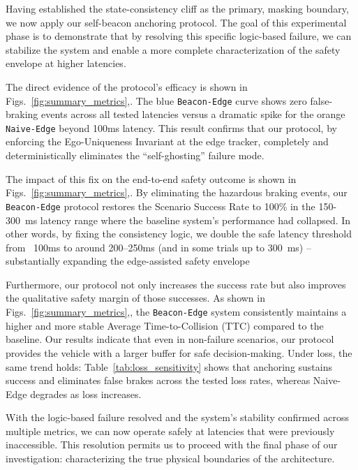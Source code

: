 Having established the state-consistency cliff as the primary, masking boundary, we now apply our self-beacon anchoring protocol. The goal of this experimental phase is to demonstrate that by resolving this specific logic-based failure, we can stabilize the system and enable a more complete characterization of the safety envelope at higher latencies.

The direct evidence of the protocol's efficacy is shown in Figs.~\ref{fig:summary_metrics},. The blue \texttt{Beacon-Edge} curve shows zero false-braking events across all tested latencies versus a dramatic spike for the orange \texttt{Naive-Edge} beyond 100ms latency. This result confirms that our protocol, by enforcing the Ego-Uniqueness Invariant at the edge tracker, completely and deterministically eliminates the ``self-ghost\-ing'' failure mode.

The impact of this fix on the end-to-end safety outcome is shown in Figs.~\ref{fig:summary_metrics},. By eliminating the hazardous braking events, our \texttt{Beacon-Edge} protocol restores the Scenario Success Rate to 100\% in the 150-300~ms latency range where the baseline system's performance had collapsed. In other words, by fixing the consistency logic, we double the safe latency threshold from ~100ms to around 200–250ms (and in some trials up to 300 ms) – substantially expanding the edge-assisted safety envelope

Furthermore, our protocol not only increases the success rate but also improves the qualitative safety margin of those successes. As shown in Figs.~\ref{fig:summary_metrics},, the \texttt{Beacon-Edge} system consistently maintains a higher and more stable Average Time-to-Collision (TTC) compared to the baseline. Our results indicate that even in non-failure scenarios, our protocol provides the vehicle with a larger buffer for safe decision-making. Under loss, the same trend holds: Table~\ref{tab:loss_sensitivity} shows that anchoring sustains success and eliminates false brakes across the tested loss rates, whereas Naive-Edge degrades as loss increases.


With the logic-based failure resolved and the system's stability confirmed across multiple metrics, we can now operate safely at latencies that were previously inaccessible. This resolution permits us to proceed with the final phase of our investigation: characterizing the true physical boundaries of the architecture. 

